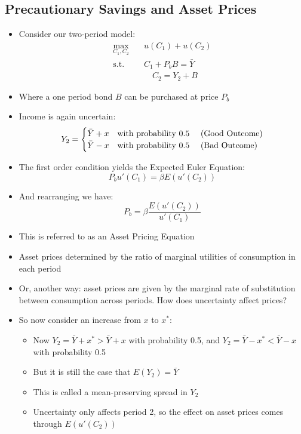 \documentclass[a4paper,twoside]{article}
\newif\IfInSansMode
\numberwithin{equation}{section}
\numberwithin{figure}{section}
\begin{document}
\subsection{Precautionary Savings and Asset Prices}
	\begin{itemize}
		\item Consider our two-period model:
		\begin{align*}
			\max_{C_1,C_2}\quad &u(C_1) + u(C_2) \\
			\text{s.t.}\quad &C_1 + P_b B = \bar{Y} \\
			&\quad C_2 = Y_2 + B
		\end{align*}
		\item Where a one period bond \( B \) can be purchased at price \( P_b \)
		\item Income is again uncertain:
		\[
			Y_2 =
			\begin{cases}
				\bar{Y} + x & \text{with probability 0.5 \quad (Good Outcome)} \\
				\bar{Y} - x & \text{with probability 0.5 \quad (Bad Outcome)}
			\end{cases}
		\]
		\item The first order condition yields the Expected Euler Equation:
		\[
			P_b u'(C_1) = \beta E (u'(C_2))
		\]
		\item And rearranging we have:
		\[
			P_b = \beta \frac{E(u'(C_2))}{u'(C_1)}
		\]
		\item This is referred to as an \textcolor{myblue}{Asset Pricing Equation}
		\item Asset prices determined by the ratio of marginal utilities of consumption in each period
		\item Or, another way: asset prices are given by the marginal rate of substitution between consumption across periods. \textcolor{myblue}{How does uncertainty affect prices?}
		\item So now consider an increase from \( x \) to \( x^* \):
		\begin{itemize}
			\item Now \( Y_2 = \bar{Y} + x^* > \bar{Y} + x \) with probability 0.5, and \( Y_2 = \bar{Y} - x^* < \bar{Y} - x \) with probability 0.5
			\item But it is still the case that \( E(Y_2) = \bar{Y} \)
			\item This is called a \textcolor{myblue}{mean-preserving spread} in \( Y_2 \)
			\item Uncertainty only affects period 2, so the effect on asset prices comes through  \( E(u'(C_2)) \)
		\end{itemize}
	\end{itemize}
\end{document}
